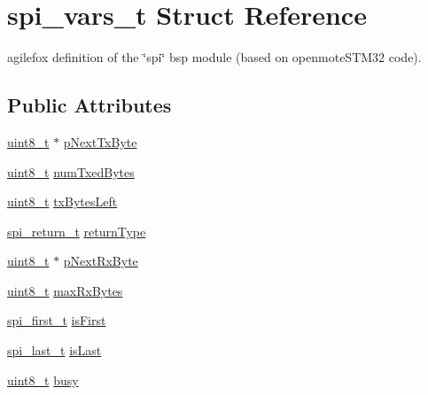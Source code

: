 \hypertarget{structspi__vars__t}{}\section{spi\+\_\+vars\+\_\+t Struct Reference}
\label{structspi__vars__t}


agilefox definition of the \char`\"{}spi\char`\"{} bsp module (based on openmote\+S\+T\+M32 code).  


\subsection*{Public Attributes}
\begin{DoxyCompactItemize}
\item 
\hyperlink{_p_e___types_8h_aba7bc1797add20fe3efdf37ced1182c5}{uint8\+\_\+t} $\ast$ \hyperlink{structspi__vars__t_a5653b6ac9c34ecb6167d87174f96ef39}{p\+Next\+Tx\+Byte}
\item 
\hyperlink{_p_e___types_8h_aba7bc1797add20fe3efdf37ced1182c5}{uint8\+\_\+t} \hyperlink{structspi__vars__t_a02eecfe8e5d2d6c12ba061163716d7b8}{num\+Txed\+Bytes}
\item 
\hyperlink{_p_e___types_8h_aba7bc1797add20fe3efdf37ced1182c5}{uint8\+\_\+t} \hyperlink{structspi__vars__t_a99b47617d35243eb2ad6322a694acc28}{tx\+Bytes\+Left}
\item 
\hyperlink{spi_8h_acc3b28d69cd1e029d05f77aa7d1ede06}{spi\+\_\+return\+\_\+t} \hyperlink{structspi__vars__t_a6b580459aa36aa4af18405db898ae22c}{return\+Type}
\item 
\hyperlink{_p_e___types_8h_aba7bc1797add20fe3efdf37ced1182c5}{uint8\+\_\+t} $\ast$ \hyperlink{structspi__vars__t_ae529d2b5c518a2b70982756a9621b8e6}{p\+Next\+Rx\+Byte}
\item 
\hyperlink{_p_e___types_8h_aba7bc1797add20fe3efdf37ced1182c5}{uint8\+\_\+t} \hyperlink{structspi__vars__t_a1a39ff9207348b06f1a14f052c673a66}{max\+Rx\+Bytes}
\item 
\hyperlink{spi_8h_af5f18ca9b261f81e8649655fa1bdb3a2}{spi\+\_\+first\+\_\+t} \hyperlink{structspi__vars__t_a437ce98251c491082689c63d85098b76}{is\+First}
\item 
\hyperlink{spi_8h_a6a8a77d768dca340b71324f2aec66a97}{spi\+\_\+last\+\_\+t} \hyperlink{structspi__vars__t_a807da5fee1e4af51e310efd1879b8137}{is\+Last}
\item 
\hyperlink{_p_e___types_8h_aba7bc1797add20fe3efdf37ced1182c5}{uint8\+\_\+t} \hyperlink{structspi__vars__t_a9cdd1f9be37409d29b7a76ca33514e23}{busy}
\end{DoxyCompactItemize}


